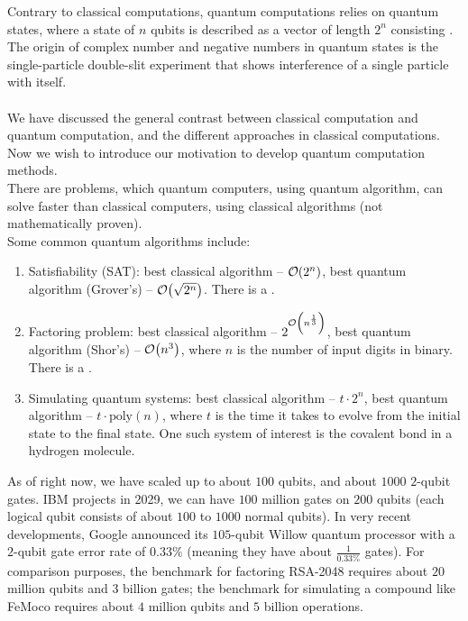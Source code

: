 Contrary to classical computations, quantum computations relies on quantum states, where a state of $n$ qubits is described as a vector of length $2^n$ consisting . The origin of complex number and negative numbers in quantum states is the single-particle double-slit experiment that shows interference of a single particle with itself. \\
\bigskip \\
We have discussed the general contrast between classical computation and quantum computation, and the different approaches in classical computations. Now we wish to introduce our motivation to develop quantum computation methods. \\
There are  problems, which quantum computers, using  quantum algorithm, can solve faster than classical computers, using  classical algorithms (not mathematically proven). \\
Some common quantum algorithms include:
\begin{enumerate}
    \item Satisfiability (SAT): best classical algorithm -- $\order{2^n}$, best quantum algorithm (Grover's) -- $\order{\sqrt{2^n}}$. There is a .
    \item Factoring problem: best classical algorithm -- $2^{\order{n^\frac{1}{3}}}$, best quantum algorithm (Shor's) -- $\order{n^3}$, where $n$ is the number of input digits in binary. There is a .
    \item Simulating quantum systems: best classical algorithm -- $t \cdot 2^n$, best quantum algorithm -- $t \cdot \text{poly}(n)$, where $t$ is the time it takes to evolve from the initial state to the final state. One such system of interest is the covalent bond in a hydrogen molecule.
\end{enumerate}
As of right now, we have scaled up to about $100$  qubits, and about $1000$ $2$-qubit gates. IBM projects in 2029, we can have $100$ million gates on $200$  qubits (each logical qubit consists of about $100$ to $1000$ normal qubits). In very recent developments, Google announced its $105$-qubit Willow quantum processor with a $2$-qubit gate error rate of $0.33\%$ (meaning they have about $\frac{1}{0.33\%}$ gates). For comparison purposes, the benchmark for factoring RSA-2048 requires about $20$ million qubits and $3$ billion gates; the benchmark for simulating a compound like FeMoco requires about $4$ million qubits and $5$ billion operations.

\newpage
